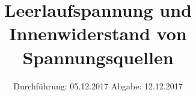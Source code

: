
\usepackage{wrapfig}
\subject{VERSUCH 301}
\title{Leerlaufspannung und Innenwiderstand von Spannungsquellen}
\date{%
  \hspace{-2.5em}
  Durchführung: 05.12.2017
  \hspace{4em}
  Abgabe: 12.12.2017
}


  \setlength{\parindent}{0em}
  \maketitle
  \thispagestyle{empty}
  \newpage
  \tableofcontents
  \newpage





\printbibliography{}



